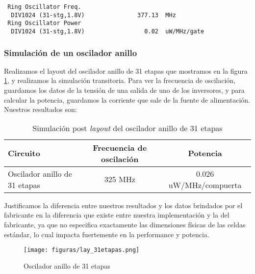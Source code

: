 \begin{footnotesize}
\begin{verbatim}
 Ring Oscillator Freq.                                   
  DIV1024 (31-stg,1.8V)               377.13  MHz        
 Ring Oscillator Power                                   
  DIV1024 (31-stg,1.8V)                 0.02  uW/MHz/gate
\end{verbatim}
\end{footnotesize}

\subsubsection{Simulación de un oscilador anillo}
Realizamos el layout del oscilador anillo de 31 etapas que mostramos en la figura \ref{fig:lay_31etapas}, y realizamos la simulación transitoria. Para ver la frecuencia de oscilación, guardamos los datos de la tensión de una salida de uno de los inversores, y para calcular la potencia, guardamos la corriente que sale de la fuente de alimentación. Nuestros resultados son:

\begin{table}[h]
\centering
\begin{tabular}{@{}lcc@{}}
\toprule
Circuito	&	Frecuencia de oscilación	&	Potencia \\ \midrule
Oscilador anillo de 31 etapas               & 325 MHz	& 0.026 uW/MHz/compuerta   \\ \bottomrule
\end{tabular}
\caption{Simulación post \emph{layout} del oscilador anillo de 31 etapas}
\label{cuadro:RO31}
\end{table}

Justificamos la diferencia entre nuestros resultados y los datos brindados por el fabricante en la diferencia que existe entre nuestra implementación y la del fabricante, ya que no especifica exactamente las dimensiones físicas de las celdas estándar, lo cual impacta fuertemente en la performance y potencia. 


\begin{figure}
  \centering
\texttt{[image: figuras/lay\_31etapas.png]}
  \caption{Oscilador anillo de 31 etapas}
\label{fig:lay_31etapas}
\end{figure}

